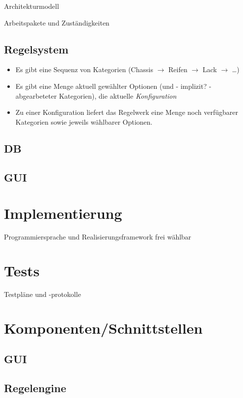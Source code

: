 \documentclass[a4paper,10pt]{article}
\begin{document}
Architekturmodell

Arbeitspakete und Zuständigkeiten

\subsection*{Regelsystem}

\begin{itemize}
 \item Es gibt eine Sequenz von Kategorien (Chassis $\rightarrow$ Reifen $\rightarrow$ Lack $\rightarrow$ \ldots)
 \item Es gibt eine Menge aktuell gewählter Optionen (und - implizit? - abgearbeteter Kategorien), die aktuelle \emph{Konfiguration}
 \item Zu einer Konfiguration liefert das Regelwerk eine Menge noch verfügbarer Kategorien sowie jeweils wählbarer Optionen.
\end{itemize}




\subsection*{DB}

\subsection*{GUI}

\section{Implementierung}
Programmiersprache und Realisierungsframework frei wählbar
\section{Tests}
Testpläne und -protokolle



\section{Komponenten/Schnittstellen}

\subsection*{GUI}


\subsection*{Regelengine}
\end{document}
